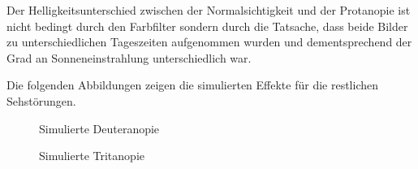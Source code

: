 \documentclass[a4paper]{article}
\begin{document}
Der Helligkeitsunterschied zwischen der Normalsichtigkeit und der Protanopie ist nicht bedingt durch den Farbfilter sondern durch die Tatsache, dass beide Bilder zu unterschiedlichen Tageszeiten aufgenommen wurden und dementsprechend der Grad an Sonneneinstrahlung unterschiedlich war.

Die folgenden Abbildungen zeigen die simulierten Effekte für die restlichen Sehstörungen.

\begin{figure}[H]
\centering
{}
\caption{Simulierte Deuteranopie}
\end{figure}

\begin{figure}[H]
\centering
{}
\caption{Simulierte Tritanopie}
\end{figure}
\end{document}
